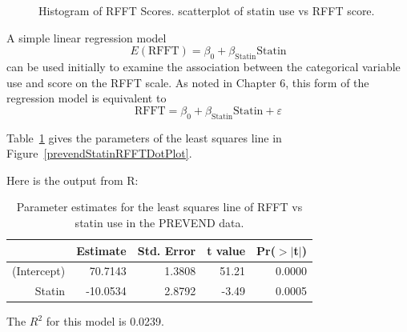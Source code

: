 \begin{figure}[ht]
	\centering
	\caption{ Histogram of RFFT Scores.  scatterplot of statin use vs RFFT score.}
	\label{prevendStatinRFFTPlot}
\end{figure}


A simple linear regression model
\[
   E(\text{RFFT}) = \beta_0 + \beta_{\text{Statin}}\text{Statin}
   \label{RFFTStatinModel}
\]
can be used initially to examine the association between the categorical variable  use and score on the RFFT scale.  As noted in Chapter 6, this form of the regression model is equivalent to 
\[
   \text{RFFT} = \beta_0 + \beta_{\text{Statin}}\text{Statin} + \varepsilon
\]

Table~\ref{prevendRFFTStatinRegression} gives the parameters of the least squares line in Figure~\ref{prevendStatinRFFTDotPlot}.

Here is the output from \textsf{R}:

\begin{table}[ht]
\centering
\begin{tabular}{rrrrr}
  \hline
 & Estimate & Std. Error & t value & Pr($>$$|$t$|$) \\ 
  \hline
(Intercept) & 70.7143 & 1.3808 & 51.21 & 0.0000 \\ 
  Statin & -10.0534 & 2.8792 & -3.49 & 0.0005 \\ 
   \hline
\end{tabular}
\caption{Parameter estimates for the least squares 
       line of RFFT vs statin use in the PREVEND data.} 
\label{prevendRFFTStatinRegression}
\end{table}
The $R^2$ for this model is 0.0239.
 
